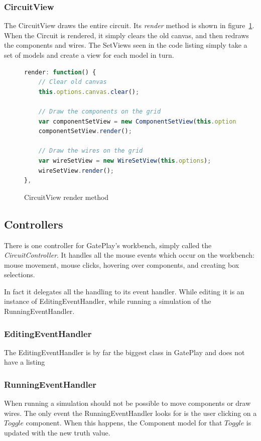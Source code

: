 \subsubsection{CircuitView}
The CircuitView draws the entire circuit. Its \textit{render} method is shown in figure~\ref{fig:circuitrender}. When the Circuit is rendered, it simply clears the old canvas, and then redraws the components and wires. The SetViews seen in the code listing simply take a set of models and create a view for each model in turn.

\begin{figure}
\begin{lstlisting}[language=JavaScript]
render: function() {
	// Clear old canvas
    this.options.canvas.clear();

    // Draw the components on the grid
    var componentSetView = new ComponentSetView(this.options);
    componentSetView.render();

    // Draw the wires on the grid
    var wireSetView = new WireSetView(this.options);
    wireSetView.render();
},
\end{lstlisting}
\caption{CircuitView render method}
\label{fig:circuitrender}
\end{figure}

\subsection{Controllers}
There is one controller for GatePlay's workbench, simply called the \textit{CircuitController}. It handles all the mouse events which occur on the workbench: mouse movement, mouse clicks, hovering over components, and creating box selections.

In fact it delegates all the handling to its event handler. While editing it is an instance of EditingEventHandler, while running a simulation of the RunningEventHandler.

\subsubsection{EditingEventHandler}
The EditingEventHandler is by far the biggest class in GatePlay and does not have a listing

\subsubsection{RunningEventHandler}
When running a simulation should not be possible to move components or draw wires. The only event the RunningEventHandler looks for is the user clicking on a $Toggle$ component. When this happens, the Component model for that $Toggle$ is updated with the new truth value.

